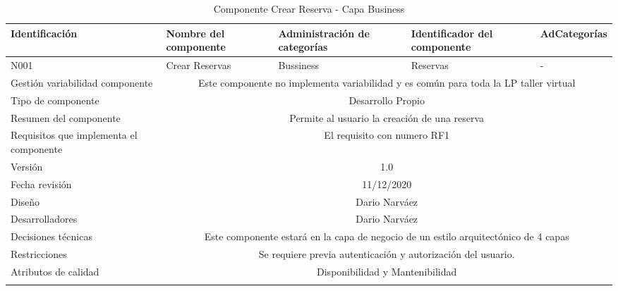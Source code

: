 \documentclass[10pt,a4paper,openany]{book}
\begin{document}
\begin{longtable}{|p{3cm}|p{3cm}|p{3cm}|p{3cm}|p{3cm}|} \hline
Identificación & Nombre del componente & Administración de categorías & Identificador del componente & AdCategorías \\[0.5ex] \hline
N001& Crear Reservas& Bussiness& Reservas& -\\[0.5ex] \hline
Gestión variabilidad componente & \multicolumn{4}{|c|}{Este componente no implementa variabilidad y es común para toda la LP taller virtual} \\ \hline
Tipo de componente & \multicolumn{4}{|c|}{Desarrollo Propio} \\ \hline
Resumen del componente & \multicolumn{4}{|c|}{Permite al usuario la creación de una reserva} \\ \hline
Requisitos que implementa el componente & \multicolumn{4}{|c|}{El requisito con numero RF1 } \\ \hline
Versión & \multicolumn{4}{|c|}{1.0 } \\ \hline
Fecha revisión & \multicolumn{4}{|c|}{ 11/12/2020} \\ \hline
Diseño & \multicolumn{4}{|c|}{Dario Narváez} \\ \hline
Desarrolladores & \multicolumn{4}{|c|}{Dario Narváez} \\ \hline
Decisiones técnicas & \multicolumn{4}{|c|}{Este componente estará en la capa de negocio de un estilo arquitectónico de 4 capas  } \\ \hline
Restricciones & \multicolumn{4}{|c|}{Se requiere previa autenticación y autorización del usuario.} \\ \hline
Atributos de calidad & \multicolumn{4}{|c|}{Disponibilidad y Mantenibilidad} \\ \hline
\caption{Componente Crear Reserva - Capa Business}
\label{table:t6}
\end{longtable}
\end{document}
